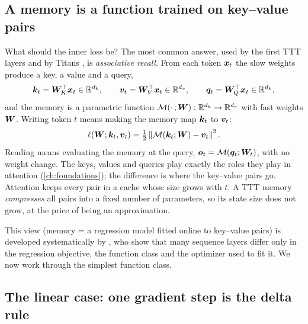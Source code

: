 \subsection{A memory is a function trained on key--value pairs}\label{sec:c09-memfunction}

What should the inner loss be? The most common answer, used by the first TTT layers
\citep{c02-sun2024ttt} and by Titans \citep{behrouz2025titans}, is \emph{associative
recall}. From each token $\bm{x}_t$ the slow weights produce a key, a value and a query,
\begin{equation}
  \bm{k}_t = \bm{W}_K^{\top} \bm{x}_t \in \mathbb{R}^{d_k}, \qquad \bm{v}_t = \bm{W}_V^{\top} \bm{x}_t \in \mathbb{R}^{d_v}, \qquad
  \bm{q}_t = \bm{W}_Q^{\top} \bm{x}_t \in \mathbb{R}^{d_k},
\end{equation}
and the memory is a parametric function $\mathcal{M}(\cdot\,; \bm{W}) : \mathbb{R}^{d_k} \to \mathbb{R}^{d_v}$
with fast weights $\bm{W}$. Writing token $t$ means making the memory map $\bm{k}_t$ to $\bm{v}_t$:
\begin{equation}\label{eq:c09-assoc-loss}
  \ell(\bm{W}; \bm{k}_t, \bm{v}_t) = \tfrac{1}{2} \left\lVert \mathcal{M}(\bm{k}_t; \bm{W}) - \bm{v}_t\right\rVert^2 .
\end{equation}
Reading means evaluating the memory at the query, $\bm{o}_t = \mathcal{M}(\bm{q}_t; \bm{W}_t)$, with
no weight change. The keys, values and queries play exactly the roles they play in attention
(\cref{ch:foundations}); the difference is where the key--value pairs go. Attention keeps every
pair in a cache whose size grows with $t$. A TTT memory \emph{compresses} all pairs into a
fixed number of parameters, so its state size does not grow, at the price of being an
approximation.

This view (memory = a regression model fitted online to key--value pairs) is developed
systematically by \citet{c02-wang2025regression}, who show that many sequence layers
differ only in the regression objective, the function class and the optimizer used to fit it.
We now work through the simplest function class.

\subsection{The linear case: one gradient step is the delta rule}\label{sec:c09-linear-case}

